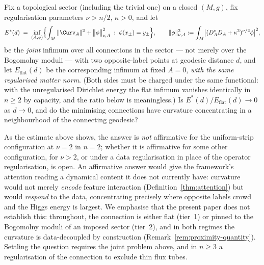 \begin{question}
\label{q:joint-minimiser}
Fix a topological sector (including the trivial one) on a closed
$(M,g)$, fix regularisation parameters $\nu>n/2$, $\kappa>0$, and
let
\[
   E^*(d)\;=\;\inf_{(A,\phi)}\Bigl\{\int_M\|\Curv_A\|^2
   +\bigl\|\phi\bigr\|^2_{\nu,A} \;:\; \phi(x_\pm)=y_\pm\Bigr\},
   \qquad
   \|\phi\|^2_{\nu,A}:=\int_M\bigl|(D_A^*D_A+\kappa^2)^{\nu/2}\phi\bigr|^2,
\]
be the \emph{joint} infimum over all connections in the sector ---
not merely over the Bogomolny moduli --- with two opposite-label
points at geodesic distance $d$, and let $E_{\mathrm{flat}}(d)$ be
the corresponding infimum at fixed $A=0$, \emph{with the same
regularised matter norm}. (Both sides must be charged under the same
functional: with the unregularised Dirichlet energy the flat
infimum vanishes identically in $n\geq 2$ by capacity, and the ratio
below is meaningless.) Is
$E^*(d)/E_{\mathrm{flat}}(d)\to 0$ as $d\to 0$, and do the
minimising connections have curvature concentrating in a
neighbourhood of the connecting geodesic?

As the estimate above shows, the answer is \emph{not} affirmative
for the uniform-strip configuration at $\nu=2$ in $n=2$; whether it
is affirmative for some other configuration, for $\nu>2$, or under a
data regularisation in place of the operator regularisation, is
open. An affirmative answer would give the framework's attention
reading a dynamical content it does not currently have: curvature
would not merely \emph{encode} feature interaction
(Definition~\ref{thm:attention}) but would \emph{respond} to the
data, concentrating precisely where opposite labels crowd and the
Higgs energy is largest. We emphasise that the present paper does
not establish this: throughout, the connection is either flat
(tier~1) or pinned to the Bogomolny moduli of an imposed sector
(tier~2), and in both regimes the curvature is data-decoupled by
construction (Remark~\ref{rem:proximity-quantity}).
Settling the question requires the joint problem above, and in
$n\geq 3$ a regularisation of the connection to exclude thin flux
tubes.
\end{question}

